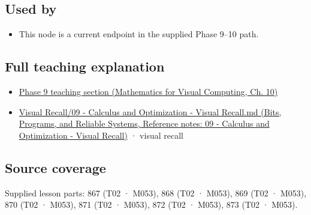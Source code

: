 \subsection{Used by}\label{appendix-54c8f5828387-used-by}

\hypertarget{appendix-54c8f5828387-used-by}{}

\begin{itemize}
\tightlist
\item
  This node is a current endpoint in the supplied Phase 9--10 path.
\end{itemize}

\subsection{Full teaching explanation}\label{appendix-54c8f5828387-full-teaching-explanation}

\hypertarget{appendix-54c8f5828387-full-teaching-explanation}{}

\begin{itemize}
\tightlist
\item
  \href{../02-Mathematics-for-Visual-Computing/main.pdf\#nameddest=02-foundations-ii-ch026-optimization-and-inverse-problems}{Phase 9 teaching section (Mathematics for Visual Computing, Ch. 10)}
\item
  \href{../01-Bits-Programs-and-Reliable-Systems/main.pdf\#nameddest=appendix-adf48f5dc5c1}{Visual Recall/09 - Calculus and Optimization - Visual Recall.md (Bits, Programs, and Reliable Systems, Reference notes: 09 - Calculus and Optimization - Visual Recall)} · visual recall
\end{itemize}

\subsection{Source coverage}\label{appendix-54c8f5828387-source-coverage}

\hypertarget{appendix-54c8f5828387-source-coverage}{}

Supplied lesson parts: 867 (T02 · M053), 868 (T02 · M053), 869 (T02 · M053), 870 (T02 · M053), 871 (T02 · M053), 872 (T02 · M053), 873 (T02 · M053).
